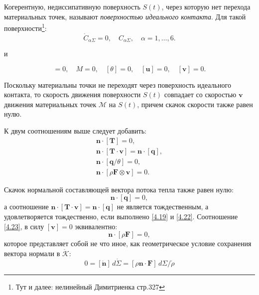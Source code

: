 
Когерентную, недиссипативную поверхность $S(t)$, через которую нет перехода материальных точек, называют \textit{поверхностью идеального контакта}. Для такой поверхности\footnote{Тут и далее: нелинейный Димитриенка стр.327}: 
\begin{equation}
	\mathring{C}_{\alpha\Sigma} = 0, \quad C_{\alpha\Sigma}, \quad \alpha = 1, \dots, 6.
\end{equation}

и 

\begin{equation}
	[\mathring{\mathbf{x}}] = 0, \quad M = 0, \quad [\theta] = 0, \quad [\mathbf{u}] = 0, \quad [\mathbf{v}] = 0. \label{4.19}
\end{equation}

Поскольку материальны точки не переходят через поверхность идеального контакта, то скорость движения поверхности $S(t)$ совпадает со скоростью $\mathbf{v}$ движения материальных точек $\mathcal{M}$ на $S(t)$, причем скачок скорости также равен нулю.

К двум соотношениям выше следует добавить: 
\begin{gather}
	\mathbf{n} \cdot [\mathbf{T}] = 0, \label{4.20} \\
	\mathbf{n} \cdot [\mathbf{T} \cdot \mathbf{v}] = \mathbf{n} \cdot [\mathbf{q}], \label{4.21} \\
	\mathbf{n} \cdot [\mathbf{q}/\theta] = 0, \label{4.22}\\
	\mathbf{n} \cdot [\rho \mathbf{F} \otimes \mathbf{v}] = 0. \label{4.23}
\end{gather}

Скачок нормальной составляющей вектора потока тепла также равен нулю:
\begin{equation}
	\mathbf{n} \cdot [\mathbf{q}] = 0,
\end{equation}
а соотношение $	\mathbf{n} \cdot [\mathbf{T} \cdot \mathbf{v}] = \mathbf{n} \cdot [\mathbf{q}]$ не является тождественным, а удовлетворяется тождественно, если выполнено \ref{4.19} и \ref{4.22}. Соотношение \ref{4.23}, в силу $[\mathbf{v}] = 0$ эквивалентно:
\begin{equation}
	\mathbf{n} \cdot [\rho \mathbf{F}] = 0,
\end{equation}
которое представляет собой не что иное, как геометрическое условие сохранения вектора нормали в $\mathring{\mathcal{K}}$:
\begin{equation*}
	0 = [\mathring{\mathbf{n}}] \, d\mathring{\Sigma} = [\rho \mathbf{n} \cdot \mathbf{F}] \, d\Sigma/\mathring{\rho}
\end{equation*}


